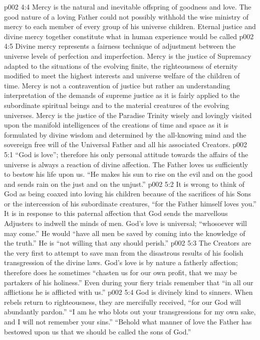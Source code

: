 \vs p002 4:4 Mercy is the natural and inevitable offspring of goodness and love. The good nature of a loving Father could not possibly withhold the wise ministry of mercy to each member of every group of his universe children. Eternal justice and divine mercy together constitute what in human experience would be called 
\vs p002 4:5 Divine mercy represents a fairness technique of adjustment between the universe levels of perfection and imperfection. Mercy is the justice of Supremacy adapted to the situations of the evolving finite, the righteousness of eternity modified to meet the highest interests and universe welfare of the children of time. Mercy is not a contravention of justice but rather an understanding interpretation of the demands of supreme justice as it is fairly applied to the subordinate spiritual beings and to the material creatures of the evolving universes. Mercy is the justice of the Paradise Trinity wisely and lovingly visited upon the manifold intelligences of the creations of time and space as it is formulated by divine wisdom and determined by the all\hyp{}knowing mind and the sovereign free will of the Universal Father and all his associated Creators.
\vs p002 5:1 “God is love”; therefore his only personal attitude towards the affairs of the universe is always a reaction of divine affection. The Father loves us sufficiently to bestow his life upon us. “He makes his sun to rise on the evil and on the good and sends rain on the just and on the unjust.”
\vs p002 5:2 \pc It is wrong to think of God as being coaxed into loving his children because of the sacrifices of his Sons or the intercession of his subordinate creatures, “for the Father himself loves you.” It is in response to this paternal affection that God sends the marvellous Adjusters to indwell the minds of men. God’s love is universal; “whosoever will may come.” He would “have all men be saved by coming into the knowledge of the truth.” He is “not willing that any should perish.”
\vs p002 5:3 The Creators are the very first to attempt to save man from the disastrous results of his foolish transgression of the divine laws. God’s love is by nature a fatherly affection; therefore does he sometimes “chasten us for our own profit, that we may be partakers of his holiness.” Even during your fiery trials remember that “in all our afflictions he is afflicted with us.”
\vs p002 5:4 God is divinely kind to sinners. When rebels return to righteousness, they are mercifully received, “for our God will abundantly pardon.” “I am he who blots out your transgressions for my own sake, and I will not remember your sins.” “Behold what manner of love the Father has bestowed upon us that we should be called the sons of God.”
